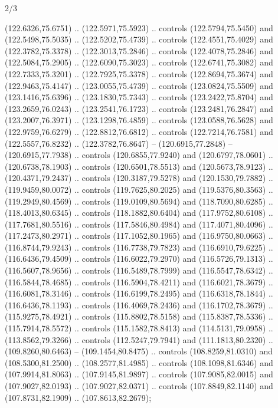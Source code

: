 \begin{flagdescription}{2/3}
\begin{scope}[shift={(0.5\flaglength,0.5)},scale=\flagwidth/320]
\begin{scope}[y=0.8pt, x=0.8pt, yscale=-1,shift={(-118.3,-146)}]
  (122.6326,75.6751) .. (122.5971,75.5923) .. controls (122.5794,75.5450) and
  (122.5498,75.5035) .. (122.5202,75.4739) .. controls (122.4551,75.4029) and
  (122.3782,75.3378) .. (122.3013,75.2846) .. controls (122.4078,75.2846) and
  (122.5084,75.2905) .. (122.6090,75.3023) .. controls (122.6741,75.3082) and
  (122.7333,75.3201) .. (122.7925,75.3378) .. controls (122.8694,75.3674) and
  (122.9463,75.4147) .. (123.0055,75.4739) .. controls (123.0824,75.5509) and
  (123.1416,75.6396) .. (123.1830,75.7343) .. controls (123.2422,75.8704) and
  (123.2659,76.0243) .. (123.2541,76.1723) .. controls (123.2481,76.2847) and
  (123.2007,76.3971) .. (123.1298,76.4859) .. controls (123.0588,76.5628) and
  (122.9759,76.6279) .. (122.8812,76.6812) .. controls (122.7214,76.7581) and
  (122.5557,76.8232) .. (122.3782,76.8647) -- (120.6915,77.2848) --
  (120.6915,77.7938) .. controls (120.6855,77.9240) and (120.6797,78.0601) ..
  (120.6738,78.1903) .. controls (120.6501,78.5513) and (120.5673,78.9123) ..
  (120.4371,79.2437) .. controls (120.3187,79.5278) and (120.1530,79.7882) ..
  (119.9459,80.0072) .. controls (119.7625,80.2025) and (119.5376,80.3563) ..
  (119.2949,80.4569) .. controls (119.0109,80.5694) and (118.7090,80.6285) ..
  (118.4013,80.6345) .. controls (118.1882,80.6404) and (117.9752,80.6108) ..
  (117.7681,80.5516) .. controls (117.5846,80.4984) and (117.4071,80.4096) ..
  (117.2473,80.2971) .. controls (117.1052,80.1965) and (116.9750,80.0663) ..
  (116.8744,79.9243) .. controls (116.7738,79.7823) and (116.6910,79.6225) ..
  (116.6436,79.4509) .. controls (116.6022,79.2970) and (116.5726,79.1313) ..
  (116.5607,78.9656) .. controls (116.5489,78.7999) and (116.5547,78.6342) ..
  (116.5844,78.4685) .. controls (116.5904,78.4211) and (116.6021,78.3679) ..
  (116.6081,78.3146) .. controls (116.6199,78.2495) and (116.6318,78.1844) ..
  (116.6436,78.1193) .. controls (116.4069,78.2436) and (116.1702,78.3679) ..
  (115.9275,78.4921) .. controls (115.8802,78.5158) and (115.8387,78.5336) ..
  (115.7914,78.5572) .. controls (115.1582,78.8413) and (114.5131,79.0958) ..
  (113.8562,79.3266) .. controls (112.5247,79.7941) and (111.1813,80.2320) ..
  (109.8260,80.6463) -- (109.1454,80.8475) .. controls (108.8259,81.0310) and
  (108.5300,81.2500) .. (108.2577,81.4985) .. controls (108.1098,81.6346) and
  (107.9914,81.8063) .. (107.9145,81.9897) .. controls (107.9085,82.0015) and
  (107.9027,82.0193) .. (107.9027,82.0371) .. controls (107.8849,82.1140) and
  (107.8731,82.1909) .. (107.8613,82.2679);


\end{scope}
\end{scope}
\end{flagdescription}
